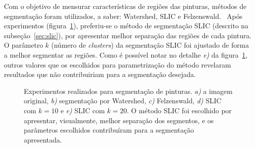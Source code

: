 Com o objetivo de mensurar características de regiões das pinturas,
métodos de segmentação foram utilizados, a saber: Watershed, SLIC e
Felzenswald.~\cite{gonzalez,luciano} Após experimentos
(figura~\ref{fig:expsegs}), preferiu-se o método de segmentação SLIC
(descrito na subseção~\ref{sec:slic}), por apresentar melhor separação
das regiões de cada pintura. O parâmetro $k$ (número
de \textit{clusters}) da segmentação SLIC foi ajustado de forma a
melhor segmentar as regiões. Como é possível notar no
detalhe \textit{e)} da figura~\ref{fig:expsegs}, outros valores que os
escolhidos para parametrização do método revelaram resultados que não
contribuiriam para a segmentação desejada.

\begin{figure}[h!]
\begin{center}
         \caption{Experimentos realizados para segmentação de pinturas. \textit{a)}
        a imagem original, \textit{b)} segmentação por Watershed, \textit{c)}
        Felzenswald, \textit{d)} SLIC com $k=10$ e \textit{e)} SLIC com
        $k=20$. O método SLIC foi escolhido por apresentar, visualmente,
        melhor separação dos segmentos, e os parâmetros escolhidos contribuíram
        para a seg\-men\-ta\-ção apresentada.}
        \label{fig:expsegs}

\end{center}
\end{figure}
